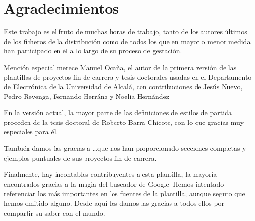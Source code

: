
\chapter*{Agradecimientos}
\label{cha:agradecimientos}

Este trabajo es el fruto de muchas horas de trabajo, tanto de los
autores últimos de los ficheros de la distribución como de todos los que
en mayor o menor medida han participado en él a lo largo de su proceso
de gestación.

Mención especial merece Manuel Ocaña, el autor de la primera versión de
las plantillas de proyectos fin de carrera y tesis doctorales usadas en
el Departamento de Electrónica de la Universidad de Alcalá, con
contribuciones de Jesús Nuevo, Pedro Revenga, Fernando Herránz y Noelia
Hernández.

En la versión actual, la mayor parte de las definiciones de estilos de
partida proceden de la tesis doctoral de Roberto Barra-Chicote, con lo
que gracias muy especiales para él.

También damos las gracias a \dots que nos
han proporcionado secciones completas y ejemplos puntuales de sus
proyectos fin de carrera.

Finalmente, hay incontables contribuyentes a esta plantilla, la mayoría
encontrados gracias a la magia del buscador de Google. Hemos intentado
referenciar los más importantes en los fuentes de la plantilla, aunque
seguro que hemos omitido alguno. Desde aquí les damos las gracias a
todos ellos por compartir su saber con el mundo.